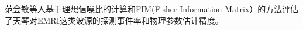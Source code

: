 \begin{comment}
由于引力波波长远远大于LISA探测臂长，故而每一组得到的迈克尔逊信号也可表示n阶谐波之和，故而可表示为$h_{\alpha}(t)\ =\ \sum_n \ h_{\alpha,n}(t) \ (\alpha=I,II),$。而其中$h_{\alpha,n}(t)$定义如(\ref{halpha})所示。故而这得到信号函数是($\theta ,\phi ,\varphi$)的函数，而这是三个自变量又随时间演化。对于不同空间探测器，主要体现在这三个角度的函数关系式不同，但是与引力波响应函数表达式是相同的。

在考虑不旋转的探测器坐标系下，基于初始空间方位角$(\theta_S,\phi_S)$和初始相位角$\phi_0$，上述三个角度的演化公式如\ref{theta-t}所示。
\begin{equation}
cos \theta(t) = \frac{1}{2}cos \theta_S -\frac{\sqrt{3}}{2} sin \theta_S cos[\bar{\phi_0} + 2\pi(t/T) - \phi_S]
\label{theta-t}
\end{equation}
\begin{equation}
\phi(t) = \bar{a_0} + 2\pi(t/T) + tan^{-1}[\frac{\sqrt{3}cos \theta_S + sin \theta_S cos[\bar{\phi_0} + 2 \pi(t/T) - \phi_S]}{2 sin \theta_S sin[\bar{\phi_0}+ 2\pi(t/T)-\phi_S]}
\end{equation}
\begin{equation}
tan \psi =\frac{A} {B}
\end{equation}
其中
\begin{equation}
A= \{ \frac{1}{2} cos \theta_L - \frac{\sqrt{3}}{2} sin \theta_L cos[\bar{\phi_0} + 2\pi (t/T)-\phi_L] - cos \theta(t) [cos \theta_L cos \theta_S + sin \theta_L sin \theta_S cos(\phi_L - \phi_S]  \}
\end{equation}



\begin{equation}
\begin{split}
B=&[\frac{1}{2}sin \theta_L sin \theta_S sin(\phi_L - \phi_S) - \frac{\sqrt{3}}{2}cos(\bar{\phi_0} + 2\pi (t/T)) (cos \theta_L sin \theta_S sin \phi_S - cos \theta_S sin \theta_L sin \phi_L ) \\
&- \frac{\sqrt{3}}{2}sin (\bar{\phi_0} + 2 \pi (t/T)) (cos \theta_S sin \theta_L cos \phi_L - cos \theta_L sin \theta_S cos \phi_S)]
\end{split}
\end{equation}



\end{comment}



范会敏等人\cite{Fan:2020zhy}基于理想信噪比的计算和FIM(Fisher Information Matrix）的方法评估了天琴对EMRI这类波源的探测事件率和物理参数估计精度。%
